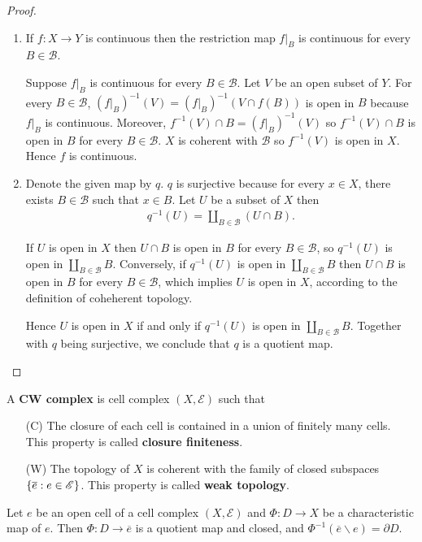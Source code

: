 \begin{proof}
	\begin{enumerate}[label={(\alph*)}]
		\item If $f: X\to Y$ is continuous then the restriction map $f\vert_{B}$ is continuous for every $B \in \mathscr{B}$.

		      Suppose $f\vert_{B}$ is continuous for every $B \in \mathscr{B}$. Let $V$ be an open subset of $Y$. For every $B \in \mathscr{B}$, ${(f\vert_{B})}^{-1}(V) = {(f\vert_{B})}^{-1}(V \cap f(B))$ is open in $B$ because $f\vert_{B}$ is continuous. Moreover, $f^{-1}(V) \cap B = {(f\vert_{B})}^{-1}(V)$ so $f^{-1}(V) \cap B$ is open in $B$ for every $B \in \mathscr{B}$. $X$ is coherent with $\mathscr{B}$ so $f^{-1}(V)$ is open in $X$. Hence $f$ is continuous.
		\item Denote the given map by $q$. $q$ is surjective because for every $x\in X$, there exists $B \in \mathscr{B}$ such that $x \in B$. Let $U$ be a subset of $X$ then
		      \begin{align*}
			      q^{-1}(U) = \coprod_{B\in\mathscr{B}} (U\cap B).
		      \end{align*}

		      If $U$ is open in $X$ then $U\cap B$ is open in $B$ for every $B\in\mathscr{B}$, so $q^{-1}(U)$ is open in $\coprod_{B\in\mathscr{B}}B$. Conversely, if $q^{-1}(U)$ is open in $\coprod_{B\in\mathscr{B}}B$ then $U\cap B$ is open in $B$ for every $B\in\mathscr{B}$, which implies $U$ is open in $X$, according to the definition of coheherent topology.

		      Hence $U$ is open in $X$ if and only if $q^{-1}(U)$ is open in $\coprod_{B\in\mathscr{B}}B$. Together with $q$ being surjective, we conclude that $q$ is a quotient map.
	\end{enumerate}
\end{proof}

A \textbf{CW complex} is cell complex $(X, \mathscr{E})$ such that
\begin{itemize}
	\item [(C)] The closure of each cell is contained in a union of finitely many cells. This property is called \textbf{closure finiteness}.
	\item [(W)] The topology of $X$ is coherent with the family of closed subspaces $\left\{{ \overline{e} : e \in \mathscr{E} }\right\}$. This property is called \textbf{weak topology}.
\end{itemize}

\begin{note}\label{note:characteristic-map-as-a-quotient-map}
	Let $e$ be an open cell of a cell complex $(X, \mathscr{E})$ and $\Phi: D \to X$ be a characteristic map of $e$. Then $\Phi: D \to \overline{e}$ is a quotient map and closed, and $\Phi^{-1}(\overline{e}\smallsetminus e) = \partial D$.
\end{note}

